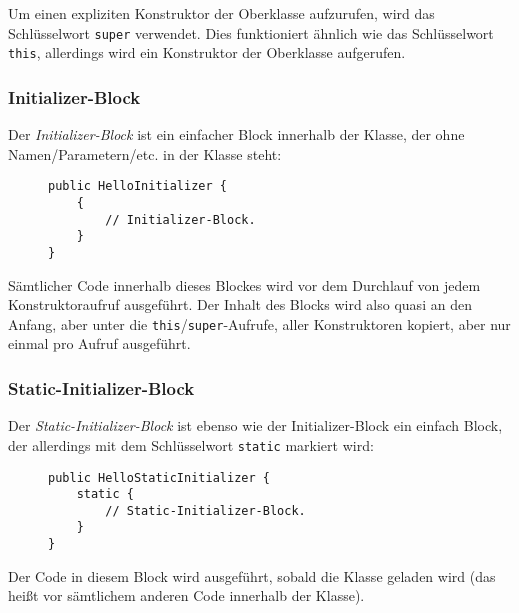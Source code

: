 		Um einen expliziten Konstruktor der Oberklasse aufzurufen, wird das Schlüsselwort \lstinline|super| verwendet. Dies funktioniert ähnlich wie das Schlüsselwort \lstinline|this|, allerdings wird ein Konstruktor der Oberklasse aufgerufen.
		
	
	\subsubsection{Initializer-Block}
		Der \textit{Initializer-Block} ist ein einfacher Block innerhalb der Klasse, der ohne Namen/Parametern/etc. in der Klasse steht:
		\begin{figure}[H]
			\centering
			\begin{lstlisting}
public HelloInitializer {
	{
		// Initializer-Block.
	}
}
\end{lstlisting}
		\end{figure}
		Sämtlicher Code innerhalb dieses Blockes wird vor dem Durchlauf von jedem Konstruktoraufruf ausgeführt. Der Inhalt des Blocks wird also quasi an den Anfang, aber unter die \lstinline|this|/\lstinline|super|-Aufrufe, aller Konstruktoren kopiert, aber nur einmal pro Aufruf ausgeführt.
	
	\subsubsection{Static-Initializer-Block}
		Der \textit{Static-Initializer-Block} ist ebenso wie der Initializer-Block ein einfach Block, der allerdings mit dem Schlüsselwort \lstinline|static| markiert wird:
		\begin{figure}[H]
			\centering
			\begin{lstlisting}
public HelloStaticInitializer {
	static {
		// Static-Initializer-Block.
	}
}
\end{lstlisting}
\end{figure}
		Der Code in diesem Block wird ausgeführt, sobald die Klasse geladen wird (das heißt vor sämtlichem anderen Code innerhalb der Klasse).
	
